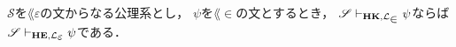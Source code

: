 \begin{comment}
		$\varphi$を$\lang{\in}$の文とし，$\varphi_{1},\cdots,\varphi_{n}$を
		$\lang{\in}$の式からなる$\varphi$への{\bf HK}の証明とする．
		$\varphi_{i}$から$\varphi_{j}$にかけて汎化が用いられ(固有変項$a$)，
		$\varphi_{k}$から$\varphi_{\ell}$にかけて汎化が用いられているとき(固有変項$a$)，
		$\varphi_{1},\cdots,\varphi_{n}$に自由に現れる$a$を$b$に置き換えたものを
		$\hat{\varphi}_{1},\cdots,\hat{\varphi}_{n}$と書けば，
		\begin{align}
			\varphi_{1},\cdots,\varphi_{j},
			\hat{\varphi}_{1},\cdots,\hat{\varphi}_{j-1},\hat{\varphi}_{j+1},
			\cdots,\hat{\varphi}_{n}
		\end{align}
		は$\varphi$への正則証明になっている．
		\QED
	\end{comment}
	
	\begin{screen}
		\begin{metathm}
		\label{metathm:theorems_in_HK_provable_in_HE}
			$\mathscr{S}$を$\lang{\varepsilon}$の文からなる公理系とし，
			$\psi$を$\lang{\in}$の文とするとき，
			$\mathscr{S} \provable{\mbox{{\bf HK}},\lang{\in}} \psi$ならば
			$\mathscr{S} \provable{\mbox{{\bf HE}},\lang{\varepsilon}} \psi$である．
		\end{metathm}
	\end{screen}
	
